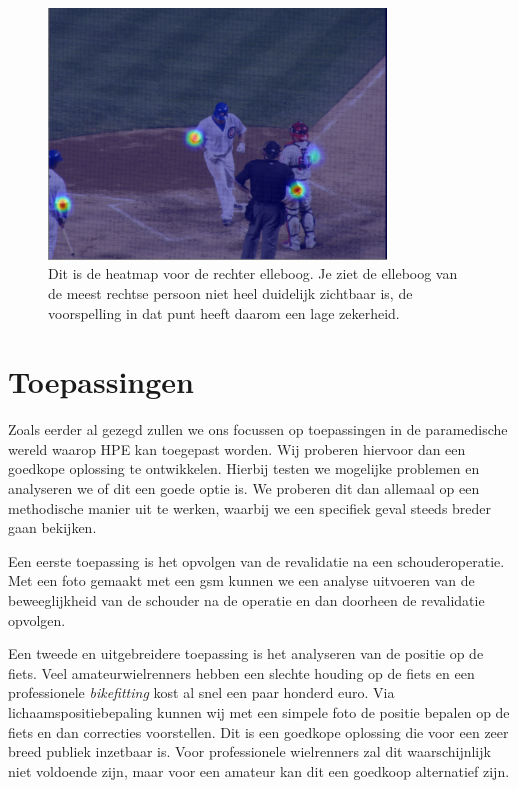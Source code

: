\documentclass[a4paper,twoside,kulak]{kulakreport}
\begin{document}
\begin{figure}
	\centering
	\includegraphics[width=0.8\textwidth]{heatmap_1}
	\caption{Dit is de heatmap voor de rechter elleboog. Je ziet de elleboog van de meest rechtse persoon niet heel duidelijk zichtbaar is, de voorspelling in dat punt heeft daarom een lage zekerheid.}
	\label{heatmap}
\end{figure}


\chapter{Toepassingen}
Zoals eerder al gezegd zullen we ons focussen op toepassingen in de paramedische wereld waarop HPE kan toegepast worden. Wij proberen hiervoor dan een goedkope oplossing te ontwikkelen. Hierbij testen we mogelijke problemen en analyseren we of dit  een goede optie is. We proberen dit dan allemaal op een methodische manier uit te werken, waarbij we een specifiek geval steeds breder gaan bekijken.

Een eerste toepassing is het opvolgen van de revalidatie na een schouderoperatie. Met een foto gemaakt met een gsm kunnen we een analyse uitvoeren van de beweeglijkheid van de schouder na de operatie en dan doorheen de revalidatie opvolgen.

Een tweede en uitgebreidere toepassing is het analyseren van de positie op de fiets. Veel amateurwielrenners hebben een slechte houding op de fiets en een professionele \emph{bikefitting} kost al snel een paar honderd euro. Via lichaamspositiebepaling kunnen wij met een simpele foto de positie bepalen op de fiets en dan correcties voorstellen. Dit is een goedkope oplossing die voor een zeer breed publiek inzetbaar is. Voor professionele wielrenners zal dit waarschijnlijk niet voldoende zijn, maar voor een amateur kan dit een goedkoop alternatief zijn.
\end{document}
